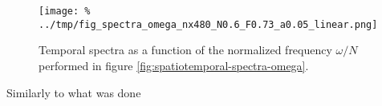 
\begin{figure} %
\centering
\texttt{[image: \%
../tmp/fig\_spectra\_omega\_nx480\_N0.6\_F0.73\_a0.05\_linear.png]}
\caption{Temporal spectra as a function of the normalized frequency $\omega/N$
performed in figure \ref{fig:spatiotemporal-spectra-omega}.
\label{fig:temporal-spectra}}
\end{figure}

Similarly to what was done
